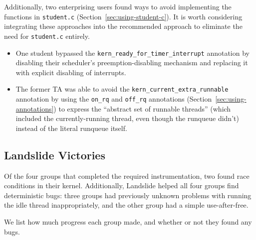 Additionally, two enterprising users found ways to avoid implementing the functions in \texttt{student.c} (Section~\ref{sec:using-student-c}). It is worth considering integrating these approaches into the recommended approach to eliminate the need for \texttt{student.c} entirely.
\begin{itemize}
	\item One student bypassed the \texttt{kern\_ready\_for\_timer\_interrupt} annotation by disabling their scheduler's preemption-disabling mechanism and replacing it with explicit disabling of interrupts. 
	\item The former TA was able to avoid the \texttt{kern\_current\_extra\_runnable} annotation by using the \texttt{on\_rq} and \texttt{off\_rq} annotations (Section~\ref{sec:using-annotations}) to express the ``abstract set of runnable threads'' (which included the currently-running thread, even though the runqueue didn't) instead of the literal runqueue itself. 
\end{itemize}

\subsection{Landslide Victories}
\label{sec:eval-victory}

Of the four groups that completed the required instrumentation, two found race conditions in their kernel. Additionally, Landslide helped all four groups find deterministic bugs: three groups had previously unknown problems with running the idle thread inappropriately, and the other group had a simple use-after-free.

We list how much progress each group made, and whether or not they found any bugs.

